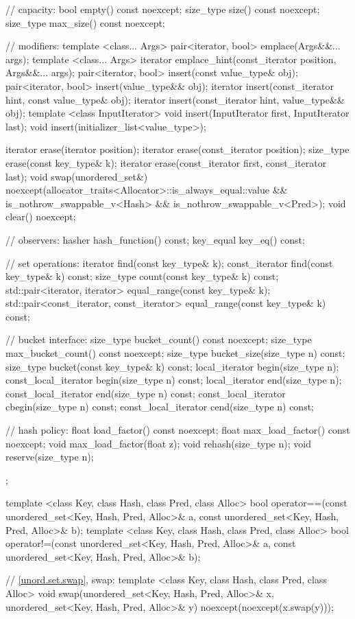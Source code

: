 \begin{codeblock}
{{    // capacity:
    bool      empty() const noexcept;
    size_type size() const noexcept;
    size_type max_size() const noexcept;

    // modifiers:
    template <class... Args> pair<iterator, bool> emplace(Args&&... args);
    template <class... Args> iterator emplace_hint(const_iterator position, Args&&... args);
    pair<iterator, bool> insert(const value_type& obj);
    pair<iterator, bool> insert(value_type&& obj);
    iterator insert(const_iterator hint, const value_type& obj);
    iterator insert(const_iterator hint, value_type&& obj);
    template <class InputIterator> void insert(InputIterator first, InputIterator last);
    void insert(initializer_list<value_type>);

    iterator  erase(iterator position);
    iterator  erase(const_iterator position);
    size_type erase(const key_type& k);
    iterator  erase(const_iterator first, const_iterator last);
    void      swap(unordered_set&)
      noexcept(allocator_traits<Allocator>::is_always_equal::value &&
               is_nothrow_swappable_v<Hash> &&
               is_nothrow_swappable_v<Pred>);
    void      clear() noexcept;

    // observers:
    hasher hash_function() const;
    key_equal key_eq() const;

    // set operations:
    iterator       find(const key_type& k);
    const_iterator find(const key_type& k) const;
    size_type      count(const key_type& k) const;
    std::pair<iterator, iterator>             equal_range(const key_type& k);
    std::pair<const_iterator, const_iterator> equal_range(const key_type& k) const;

    // bucket interface:
    size_type bucket_count() const noexcept;
    size_type max_bucket_count() const noexcept;
    size_type bucket_size(size_type n) const;
    size_type bucket(const key_type& k) const;
    local_iterator begin(size_type n);
    const_local_iterator begin(size_type n) const;
    local_iterator end(size_type n);
    const_local_iterator end(size_type n) const;
    const_local_iterator cbegin(size_type n) const;
    const_local_iterator cend(size_type n) const;

    // hash policy:
    float load_factor() const noexcept;
    float max_load_factor() const noexcept;
    void max_load_factor(float z);
    void rehash(size_type n);
    void reserve(size_type n);
  };

  template <class Key, class Hash, class Pred, class Alloc>
    bool operator==(const unordered_set<Key, Hash, Pred, Alloc>& a,
                    const unordered_set<Key, Hash, Pred, Alloc>& b);
  template <class Key, class Hash, class Pred, class Alloc>
    bool operator!=(const unordered_set<Key, Hash, Pred, Alloc>& a,
                    const unordered_set<Key, Hash, Pred, Alloc>& b);

  // \ref{unord.set.swap}, swap:
  template <class Key, class Hash, class Pred, class Alloc>
    void swap(unordered_set<Key, Hash, Pred, Alloc>& x,
              unordered_set<Key, Hash, Pred, Alloc>& y)
      noexcept(noexcept(x.swap(y)));
}
\end{codeblock}


